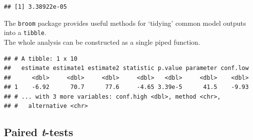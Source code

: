 \documentclass[12pt,]{krantz}
\makeatletter
\newenvironment{Shaded}{\begin{snugshade}}{\end{snugshade}}
\newcommand{\CommentTok}[1]{\textcolor[rgb]{0.56,0.35,0.01}{\textit{#1}}}
\newcommand{\DataTypeTok}[1]{\textcolor[rgb]{0.13,0.29,0.53}{#1}}
\newcommand{\DecValTok}[1]{\textcolor[rgb]{0.00,0.00,0.81}{#1}}
\newcommand{\KeywordTok}[1]{\textcolor[rgb]{0.13,0.29,0.53}{\textbf{#1}}}
\newcommand{\NormalTok}[1]{#1}
\newcommand{\OperatorTok}[1]{\textcolor[rgb]{0.81,0.36,0.00}{\textbf{#1}}}
\newcommand{\StringTok}[1]{\textcolor[rgb]{0.31,0.60,0.02}{#1}}
\newenvironment{kframe}{%
\medskip{}
\setlength{\fboxsep}{.8em}
 \def\at@end@of@kframe{}%
 \ifinner\ifhmode%
  \def\at@end@of@kframe{\end{minipage}}%
  \begin{minipage}{\columnwidth}%
 \fi\fi%
 \def\FrameCommand##1{\hskip\@totalleftmargin \hskip-\fboxsep
 \colorbox{shadecolor}{##1}\hskip-\fboxsep
     \hskip-\linewidth \hskip-\@totalleftmargin \hskip\columnwidth}%
 \MakeFramed {\advance\hsize-\width
   \@totalleftmargin\z@ \linewidth\hsize
   \@setminipage}}%
 {\par\unskip\endMakeFramed%
 \at@end@of@kframe}
\renewenvironment{Shaded}{\begin{kframe}}{\end{kframe}}
\theoremstyle{definition}
\theoremstyle{definition}
\theoremstyle{definition}
\theoremstyle{remark}
\makeatother
\begin{document}
\begin{Shaded}
\end{Shaded}

\begin{verbatim}
## [1] 3.38922e-05
\end{verbatim}

The \texttt{broom} package provides useful methods for `tidying' common
model outputs into a \texttt{tibble}.\\
The whole analysis can be constructed as a single piped function.

\begin{Shaded}
\end{Shaded}

\begin{verbatim}
## # A tibble: 1 x 10
##   estimate estimate1 estimate2 statistic p.value parameter conf.low
##      <dbl>     <dbl>     <dbl>     <dbl>   <dbl>     <dbl>    <dbl>
## 1    -6.92      70.7      77.6     -4.65 3.39e-5      41.5    -9.93
## # ... with 3 more variables: conf.high <dbl>, method <chr>,
## #   alternative <chr>
\end{verbatim}

 

\hypertarget{paired-t-tests}{%
\subsection{\texorpdfstring{Paired
\emph{t}-tests}{Paired t-tests}}\label{paired-t-tests}}
\end{document}
